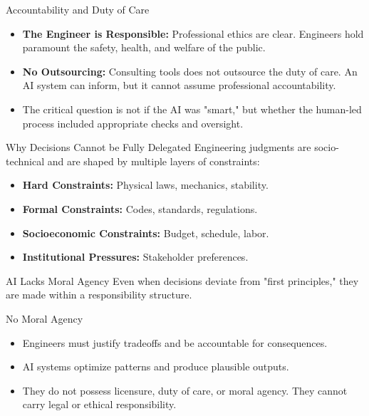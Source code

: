 \documentclass[german,10pt]{beamer}
\begin{document}
\begin{frame}{Accountability and Duty of Care}
    \justifying
    \begin{itemize}
        \item \textbf{The Engineer is Responsible:} Professional ethics are clear. Engineers hold paramount the safety, health, and welfare of the public.
        \item \textbf{No Outsourcing:} Consulting tools does not outsource the duty of care. An AI system can inform, but it cannot assume professional accountability.
        \item The critical question is not if the AI was "smart," but whether the human-led process included appropriate checks and oversight.
    \end{itemize}
\end{frame}

\begin{frame}{Why Decisions Cannot be Fully Delegated}
    \justifying
    Engineering judgments are socio-technical and are shaped by multiple layers of constraints:
    \begin{itemize}
        \item \textbf{Hard Constraints:} Physical laws, mechanics, stability.
        \item \textbf{Formal Constraints:} Codes, standards, regulations.
        \item \textbf{Socioeconomic Constraints:} Budget, schedule, labor.
        \item \textbf{Institutional Pressures:} Stakeholder preferences.
    \end{itemize}
\end{frame}

\begin{frame}{AI Lacks Moral Agency}
    \justifying
    Even when decisions deviate from "first principles," they are made within a responsibility structure.
    \begin{warningbox}{No Moral Agency}
    \begin{itemize}
        \item Engineers must justify tradeoffs and be accountable for consequences.
        \item AI systems optimize patterns and produce plausible outputs.
        \item They do not possess licensure, duty of care, or moral agency. They cannot carry legal or ethical responsibility.
    \end{itemize}
    \end{warningbox}
\end{frame}
\end{document}
